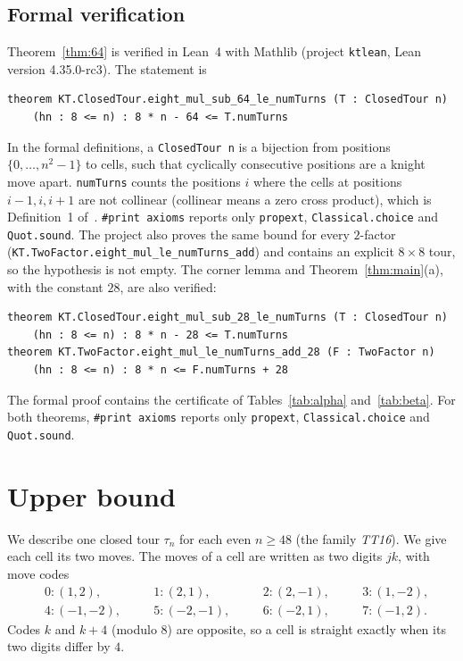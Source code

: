 \documentclass[11pt]{article}
\theoremstyle{definition}
\theoremstyle{remark}
\begin{document}
\subsection{Formal verification}\label{sec:lean}

Theorem~\ref{thm:64} is verified in Lean~4 with Mathlib (project \texttt{ktlean}, Lean version 4.35.0-rc3).
The statement is
\begin{verbatim}
theorem KT.ClosedTour.eight_mul_sub_64_le_numTurns (T : ClosedTour n)
    (hn : 8 <= n) : 8 * n - 64 <= T.numTurns
\end{verbatim}
In the formal definitions, a \texttt{ClosedTour n} is a bijection from positions $\{0,\dots,n^2-1\}$ to cells, such that cyclically consecutive positions are a knight move apart.
\texttt{numTurns} counts the positions $i$ where the cells at positions $i-1,i,i+1$ are not collinear (collinear means a zero cross product), which is Definition~1 of~\cite{bjmow}.
\texttt{\#print axioms} reports only \texttt{propext}, \texttt{Classical.choice} and \texttt{Quot.sound}.
The project also proves the same bound for every $2$-factor (\texttt{KT.TwoFactor.eight\_mul\_le\_numTurns\_add}) and contains an explicit $8\times8$ tour, so the hypothesis is not empty.
The corner lemma and Theorem~\ref{thm:main}(a), with the constant $28$, are also verified:
\begin{verbatim}
theorem KT.ClosedTour.eight_mul_sub_28_le_numTurns (T : ClosedTour n)
    (hn : 8 <= n) : 8 * n - 28 <= T.numTurns
theorem KT.TwoFactor.eight_mul_le_numTurns_add_28 (F : TwoFactor n)
    (hn : 8 <= n) : 8 * n <= F.numTurns + 28
\end{verbatim}
The formal proof contains the certificate of Tables~\ref{tab:alpha} and~\ref{tab:beta}.
For both theorems, \texttt{\#print axioms} reports only \texttt{propext}, \texttt{Classical.choice} and \texttt{Quot.sound}.

\section{Upper bound}\label{sec:upper}

We describe one closed tour $\tau_n$ for each even $n\ge48$ (the family \emph{TT16}).
We give each cell its two moves.
The moves of a cell are written as two digits $jk$, with move codes
\begin{align*}
&0:(1,2),\quad &&1:(2,1),\quad &&2:(2,-1),\quad &&3:(1,-2),\\
&4:(-1,-2),\quad &&5:(-2,-1),\quad &&6:(-2,1),\quad &&7:(-1,2).
\end{align*}
Codes $k$ and $k+4$ (modulo $8$) are opposite, so a cell is straight exactly when its two digits differ by $4$.
\end{document}
